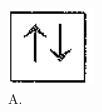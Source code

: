 \documentclass[10pt]{article}
\begin{document}
\begin{figure}[h]
\begin{center}
\captionsetup{labelformat=empty}
\caption{A.}
  \includegraphics[width=\textwidth]{2025_10_23_76620c17ffac1ae9b35bg-12(1)}
\end{center}
\end{figure}
\end{document}
